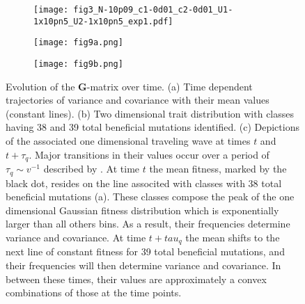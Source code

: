 \documentclass[11pt,twocolumn]{article}
\newcommand{\G}{\textbf{G}}
\begin{document}
\begin{figure}[h!]
\begin{subfigure}[b!]{0.48\linewidth}
\label{fig:3a}
\texttt{[image: fig3\_N-10p09\_c1-0d01\_c2-0d01\_U1-1x10pn5\_U2-1x10pn5\_exp1.pdf]}
\caption{}
\end{subfigure}
\begin{subfigure}[b!]{0.48\linewidth}
\label{fig:3b}
\texttt{[image: fig9a.png]}
\caption{}
\end{subfigure}

\begin{subfigure}[b]{1\linewidth}
\label{fig:3c}
\texttt{[image: fig9b.png]}
\caption{}
\end{subfigure}
\label{fig:3}
\caption{\footnotesize Evolution of the \G-matrix over time. (a) Time dependent trajectories of variance and covariance with their mean values (constant lines). (b) Two dimensional trait distribution with classes having 38 and 39 total beneficial mutations identified. (c) Depictions of the associated one dimensional traveling wave at times $t$ and $t+\tau_q$. Major transitions in their values occur over a period of $\tau_q \sim v^{-1}$ described by \citet{desai2007beneficial}. At time $t$ the mean fitness, marked by the black dot, resides on the line associted with classes with 38 total beneficial mutations (a). These classes compose the peak of the one dimensional Gaussian fitness distribution which is exponentially larger than all others bins. As a result, their frequencies determine variance and covariance. At time $t+tau_q$ the mean shifts to the next line of constant fitness for 39 total beneficial mutations, and their frequencies will then determine variance and covariance. In between these times, their values are approximately a convex combinations of those at the time points.}
\end{figure}
\end{document}
